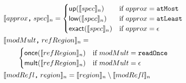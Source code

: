 \begin{align*}
&\llbracket{approx\texttt{,} \; spec}\rrbracket_n =
   \begin{cases}
     \textsf{up}(\llbracket{spec}\rrbracket_n) &\mbox{if } approx = \texttt{atMost} \\
     \textsf{low}(\llbracket{spec}\rrbracket_n) &\mbox{if } approx = \texttt{atLeast} \\
     \textsf{exact}(\llbracket{spec}\rrbracket_n) &\mbox{if } approx = \epsilon \\
   \end{cases} \\
&\llbracket{modMult\texttt{,} \; refRegion}\rrbracket_n = \\
&\quad\quad
   \begin{cases}
     \textsf{once}(\llbracket{refRegion}\rrbracket_n) &\mbox{if } modMult = \texttt{readOnce} \\
     \textsf{mult}(\llbracket{refRegion}\rrbracket_n) &\mbox{if } modMult = \epsilon \\
   \end{cases} \\
&\llbracket{modRefl\texttt{,} \; region}\rrbracket_n = 
   \llbracket{region}\rrbracket_n \setminus \llbracket{modRefl}\rrbracket_n
\end{align*}
